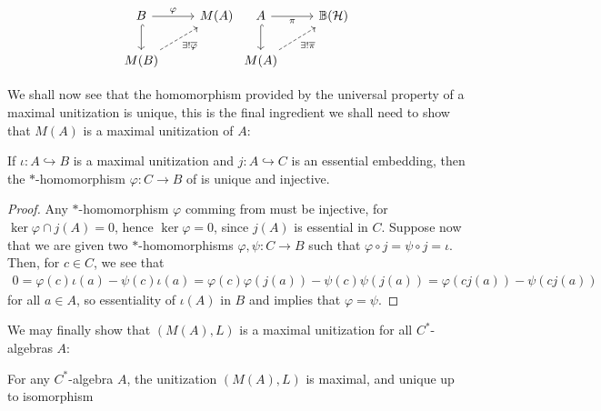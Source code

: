 \begin{equation*}
	\begin{tikzcd}
		B \ar[d, hook] \ar[r, "\varphi"] & M(A)\\
		M(B) \ar[ru,dashed,  "\exists!  \overline \varphi"'] &
	\end{tikzcd}
	\begin{tikzcd}
		A \ar[d, hook] \ar[r, "\pi"'] & \mathbb{B}(\H)\\
		M(A) \ar[ru, dashed,"\exists! \overline \pi"'] &
	\end{tikzcd}
\end{equation*}

We shall now see that the homomorphism provided by the universal property of a maximal unitization is unique, this is the final ingredient we shall need to show that $M(A)$ is a maximal unitization of $A$:
\begin{lemma}
	If $\iota \colon A \hookrightarrow B$ is a maximal unitization and $j \colon A \hookrightarrow C$ is an essential embedding, then the $*$-homomorphism $\varphi \colon C \to B$ of  is unique and injective.
	\label{mult:uniquemax}
\end{lemma}
\begin{proof}
	Any $*$-homomorphism $\varphi$ comming from  must be injective, for $\ker \varphi \cap j(A) = 0$, hence $\ker \varphi = 0$, since $j(A)$ is essential in $C$. Suppose now that we are given two $*$-homomorphisms $\varphi, \psi \colon C \to B$ such that $\varphi \circ j = \psi \circ j = \iota$. Then, for $c \in C$, we see that
	\begin{align*}
		0 = \varphi(c) \iota(a) - \psi(c) \iota(a) = \varphi(c) \varphi( j(a)) - \psi(c) \psi( j(a)) =  \varphi(cj(a))-\psi(cj(a))
	\end{align*}
	for all $a \in A$, so essentiality of $\iota(A)$ in $B$ and  implies that $\varphi = \psi$. 
\end{proof}
We may finally show that $(M(A),L)$ is a maximal unitization for all $C^*$-algebras $A$:
\begin{theorem}
	For any $C^*$-algebra $A$, the unitization $(M(A),L)$ is maximal, and unique up to isomorphism
	\label{mult:multmax}
\end{theorem}
